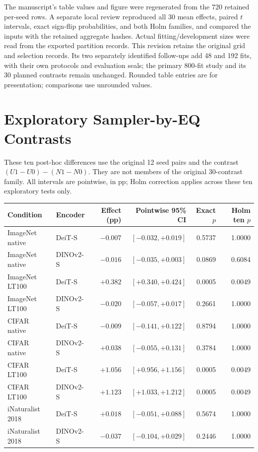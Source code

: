 \documentclass[conference]{IEEEtran}
\begin{document}
The manuscript's table values and figure were regenerated from the 720 retained per-seed rows. A separate local review reproduced all 30 mean effects, paired $t$ intervals, exact sign-flip probabilities, and both Holm families, and compared the inputs with the retained aggregate hashes. Actual fitting/development sizes were read from the exported partition records. This revision retains the original grid and selection records. Its two separately identified follow-ups add 48 and 192 fits, with their own protocols and evaluation seals; the primary 800-fit study and its 30 planned contrasts remain unchanged. Rounded table entries are for presentation; comparisons use unrounded values.
\section{Exploratory Sampler-by-EQ Contrasts}
\label{app:posthoc}
These ten post-hoc differences use the original 12 seed pairs and the contrast $(U1-U0)-(N1-N0)$. They are not members of the original 30-contrast family. All intervals are pointwise, in pp; Holm correction applies across these ten exploratory tests only.
\begin{center}\footnotesize\begin{tabular}{llrrrr}
\toprule
Condition & Encoder & Effect (pp) & Pointwise 95\% CI & Exact $p$ & Holm ten $p$ \\
\midrule
ImageNet native & DeiT-S & $-0.007$ & $[-0.032,+0.019]$ & 0.5737 & 1.0000 \\
ImageNet native & DINOv2-S & $-0.016$ & $[-0.035,+0.003]$ & 0.0869 & 0.6084 \\
ImageNet LT100 & DeiT-S & $+0.382$ & $[+0.340,+0.424]$ & 0.0005 & 0.0049 \\
ImageNet LT100 & DINOv2-S & $-0.020$ & $[-0.057,+0.017]$ & 0.2661 & 1.0000 \\
CIFAR native & DeiT-S & $-0.009$ & $[-0.141,+0.122]$ & 0.8794 & 1.0000 \\
CIFAR native & DINOv2-S & $+0.038$ & $[-0.055,+0.131]$ & 0.3784 & 1.0000 \\
CIFAR LT100 & DeiT-S & $+1.056$ & $[+0.956,+1.156]$ & 0.0005 & 0.0049 \\
CIFAR LT100 & DINOv2-S & $+1.123$ & $[+1.033,+1.212]$ & 0.0005 & 0.0049 \\
iNaturalist 2018 & DeiT-S & $+0.018$ & $[-0.051,+0.088]$ & 0.5674 & 1.0000 \\
iNaturalist 2018 & DINOv2-S & $-0.037$ & $[-0.104,+0.029]$ & 0.2446 & 1.0000 \\
\bottomrule\end{tabular}\end{center}
\end{document}
